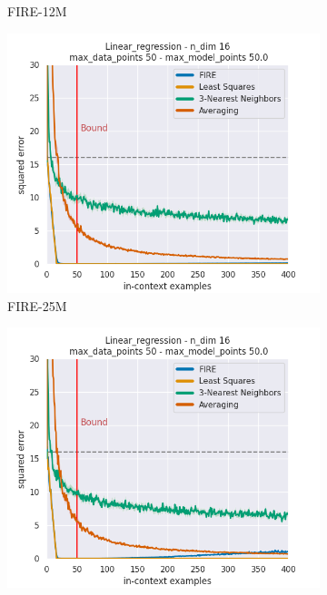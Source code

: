 \documentclass[letterpaper]{article} %
\begin{document}
\begin{figure}[tp]
\begin{subfigure}[t]{0.32\linewidth}
        \caption{FIRE-12M}
    \end{subfigure}
    \begin{subfigure}[t]{0.32\linewidth}
        \includegraphics[width=\linewidth]{AnonymousSubmission/LaTeX/imgs/experiments/linear-regression/fire.png}
        \caption{FIRE-25M}
    \end{subfigure}
    \begin{subfigure}[t]{0.32\linewidth}
        \includegraphics[width=\linewidth]{AnonymousSubmission/LaTeX/imgs/analysis/large-fire.png}

\end{subfigure}
\end{figure}
\end{document}
